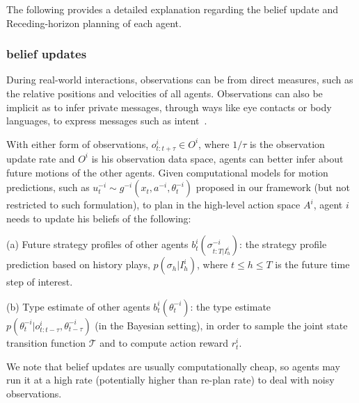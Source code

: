 \documentclass[letterpaper, 10 pt, conference]{ieeeconf}  %
\begin{document}
The following provides a detailed explanation regarding the belief update and 
Receding-horizon planning of each agent.
 
\subsubsection{belief updates}\label{sec:belief_update}
During real-world interactions, observations can be from direct measures, such as the relative positions and velocities of all agents. Observations can also be implicit as to infer private messages, through ways like eye contacts or body languages, to express messages such as intent~\cite{knepper2017implicit}.

With either form of observations, $o^i_{t:t+\tau} \in O^i$, where $1/\tau$ is the 
observation  
update rate and $O^i$ is his observation data space, agents can better infer about 
future motions of the other agents. Given computational models for motion 
predictions, such as $u^{-i}_t \sim g^{-i}(x_t,a^{-i},\theta^{-i}_t)$ proposed 
in our framework (but not restricted to such formulation), to plan in the 
high-level action space $A^i$, agent $i$ needs to update his beliefs of the 
following:

(a) Future strategy profiles of other agents $b^i_t(\sigma^{-i}_{t:T|I^i_h})$: 
the strategy profile prediction based on history plays, $p(\sigma_h|I^i_h)$, 
where $t\leq h\leq T$ is the future time step of 
interest.

(b) Type estimate of other agents $b^i_t(\theta_t^{-i})$: 
the type estimate $p(\theta^{-i}_t|o^i_{t:t-\tau},\theta^{-i}_{t-\tau})$ (in 
the Bayesian setting), in order to sample the joint state transition function 
$\mathcal{T}$ and to compute action reward $r^i_t$.


We note that belief updates are usually computationally cheap, so agents may run it at a high rate (potentially higher than re-plan rate) to deal with noisy 
observations.
 
\end{document}
